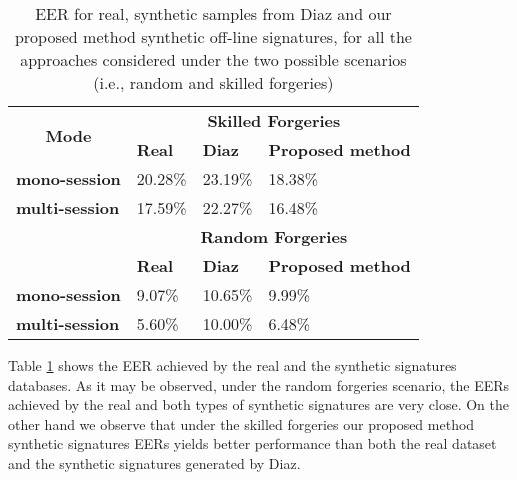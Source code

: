 \begin{table}[!htb]
\renewcommand{\arraystretch}{1.3}
\caption{EER for real, synthetic samples from Diaz \cite{diaz2014generation} and our proposed method synthetic off-line signatures, for all the approaches considered under the two possible scenarios (i.e., random and skilled forgeries)}
\label{exp1_results_table}
\centering
\begin{tabular}{|l|l|l|l|}
	\hline
	\multicolumn{1}{|c|}{\multirow{2}{*}{\textbf{Mode}}} & \multicolumn{3}{c|}{\textbf{Skilled Forgeries}}          \\ \cline{2-4} 
	\multicolumn{1}{|c|}{}                               & \textbf{Real} & \textbf{Diaz} & \textbf{Proposed method} \\ \hline
	\textbf{mono-session}                                & 20.28\%            & 23.19\%            & 18.38\%                       \\ \hline
	\textbf{multi-session}                               & 17.59\%            & 22.27\%            & 16.48\%                       \\ \hline
	\multirow{2}{*}{}                                    & \multicolumn{3}{c|}{\textbf{Random Forgeries}}           \\ \cline{2-4} 
	& \textbf{Real} & \textbf{Diaz} & \textbf{Proposed method} \\ \hline
	\textbf{mono-session}                                & 9.07\%            & 10.65\%            & 9.99\%                       \\ \hline
	\textbf{multi-session}                               & 5.60\%            & 10.00\%            & 6.48\%                       \\ \hline
\end{tabular}

\end{table}

Table \ref{exp1_results_table} shows the EER achieved by the
real and the synthetic signatures databases. As it
may be observed, under the random forgeries scenario, the
EERs achieved by the real and both types of synthetic signatures
are very close. On the other hand we observe that under the skilled forgeries our proposed method synthetic signatures EERs yields better performance than both the real dataset and the synthetic signatures generated by Diaz.

